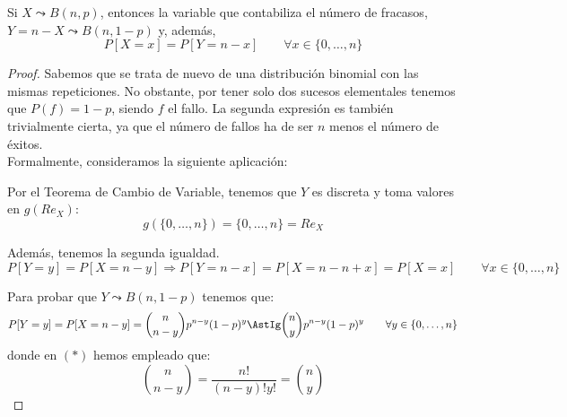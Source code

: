 \begin{prop}[Simetría]
    Si $X\leadsto B(n,p)$, entonces la variable que contabiliza el número de fracasos, $Y=n-X \leadsto B(n, 1-p)$ y, además,
    \begin{equation*}
        P[X=x] = P[Y=n-x]\qquad \forall x\in \{0,\dots,n\}
    \end{equation*}
\end{prop}
\begin{proof}
    Sabemos que se trata de nuevo de una distribución binomial con las mismas repeticiones. No obstante, por tener solo dos sucesos elementales tenemos que $P(f)=1-p$, siendo $f$ el fallo.
    La segunda expresión es también trivialmente cierta, ya que el número de fallos ha de ser $n$ menos el número de éxitos.\\

    Formalmente, consideramos la siguiente aplicación:

    Por el Teorema de Cambio de Variable, tenemos que $Y$ es discreta y toma valores en $g(Re_X)$:
    \begin{equation*}
        g\left(\{0,\dots,n\}\right)= \{0,\dots,n\} = Re_X
    \end{equation*}

    Además, tenemos la segunda igualdad.
    \begin{equation*}
        P[Y=y]=P[X=n-y]
        \Longrightarrow
        P[Y=n-x] = P[X=n-n+x] = P[X=x]\qquad \forall x\in \{0,\dots,n\}
    \end{equation*}

    Para probar que $Y\leadsto B(n,1-p)$ tenemos que:
    \begin{equation*}
        P[Y=y]=P[X=n-y] = \binom{n}{n-y}p^{n-y}(1-p)^y
        \AstIg \binom{n}{y}p^{n-y}(1-p)^y \qquad \forall y\in \{0,\dots,n\}
    \end{equation*}
    donde en $(\ast)$ hemos empleado que:
    \begin{equation*}
        \binom{n}{n-y} = \dfrac{n!}{(n-y)!y!} = \binom{n}{y}
    \end{equation*}
\end{proof}


